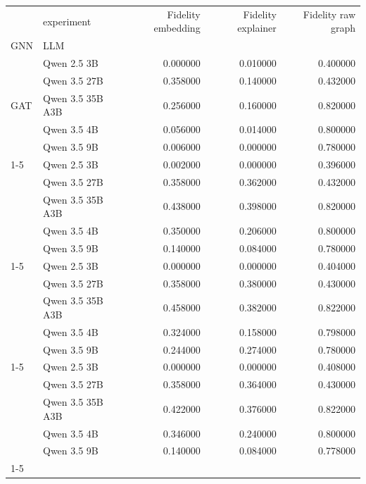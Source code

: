 \begin{tabular}{llrrr}
\toprule
 & experiment & Fidelity embedding & Fidelity explainer & Fidelity raw graph \\
GNN & LLM &  &  &  \\
\midrule
\multirow[t]{5}{*}{GAT} & Qwen 2.5 3B & 0.000000 & 0.010000 & 0.400000 \\
 & Qwen 3.5 27B & 0.358000 & 0.140000 & 0.432000 \\
 & Qwen 3.5 35B A3B & 0.256000 & 0.160000 & 0.820000 \\
 & Qwen 3.5 4B & 0.056000 & 0.014000 & 0.800000 \\
 & Qwen 3.5 9B & 0.006000 & 0.000000 & 0.780000 \\
\cline{1-5}
\multirow[t]{5}{*}{GCN} & Qwen 2.5 3B & 0.002000 & 0.000000 & 0.396000 \\
 & Qwen 3.5 27B & 0.358000 & 0.362000 & 0.432000 \\
 & Qwen 3.5 35B A3B & 0.438000 & 0.398000 & 0.820000 \\
 & Qwen 3.5 4B & 0.350000 & 0.206000 & 0.800000 \\
 & Qwen 3.5 9B & 0.140000 & 0.084000 & 0.780000 \\
\cline{1-5}
\multirow[t]{5}{*}{GIN} & Qwen 2.5 3B & 0.000000 & 0.000000 & 0.404000 \\
 & Qwen 3.5 27B & 0.358000 & 0.380000 & 0.430000 \\
 & Qwen 3.5 35B A3B & 0.458000 & 0.382000 & 0.822000 \\
 & Qwen 3.5 4B & 0.324000 & 0.158000 & 0.798000 \\
 & Qwen 3.5 9B & 0.244000 & 0.274000 & 0.780000 \\
\cline{1-5}
\multirow[t]{5}{*}{GraphSAGE} & Qwen 2.5 3B & 0.000000 & 0.000000 & 0.408000 \\
 & Qwen 3.5 27B & 0.358000 & 0.364000 & 0.430000 \\
 & Qwen 3.5 35B A3B & 0.422000 & 0.376000 & 0.822000 \\
 & Qwen 3.5 4B & 0.346000 & 0.240000 & 0.800000 \\
 & Qwen 3.5 9B & 0.140000 & 0.084000 & 0.778000 \\
\cline{1-5}
\bottomrule
\end{tabular}
